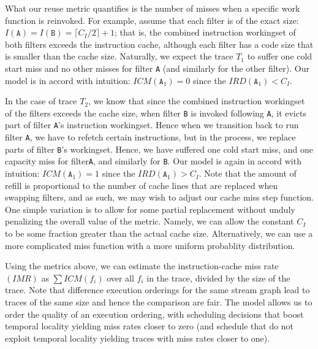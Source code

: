 What our reuse metric quantifies is the number of misses when a specific work
function is reinvoked. For example, assume that each filter is of the exact
size: $I(\texttt{A}) = I(\texttt{B}) = \lceil{C_I / 2}\rceil + 1$;
that is, the combined instruction workingset of both filters exceeds
the instruction cache, although each filter has a code size that is
smaller than the cache size. Naturally, we expect the trace $T_1$ to
suffer one cold start miss and no other misses for filter \texttt{A}
(and similarly for the other filter). Our model is in accord with
intuition:  $ICM(\texttt{A}_1) = 0$ since
the $IRD(\texttt{A}_1) < C_I$.

In the case of trace $T_2$, we know that since the combined
instruction workingset of the filters exceeds the cache size, when
filter \texttt{B} is invoked following \texttt{A}, it evicts part of
filter \texttt{A}'s instruction workingset. Hence when we transition
back to run filter \texttt{A}, we have to refetch certain
instructions, but in the process, we replace parts of filter
\texttt{B}'s workingset. Hence, we have suffered one cold start miss,
and one capacity miss for filter\texttt{A}, and similarly for
\texttt{B}. Our model is again in accord with intuition: 
$ICM(\texttt{A}_1) = 1$ since
the $IRD(\texttt{A}_1) > C_I$. Note that the
amount of refill is proportional to the number of cache lines that are
replaced when swapping filters, and as such, we may wish to adjust
our cache miss step function. One simple variation is to allow for
some partial replacement without unduly penalizing the overall value
of the metric. Namely, we can allow the constant $C_I$ to be some
fraction greater than the actual cache size. Alternatively, we can use
a more complicated miss function with a more uniform probablity
distribution.

Using the metrics above, we can estimate the instruction-cache miss
rate $(IMR)$ as $\sum ICM(f_i)$ over all $f_i$ in the trace, divided
by the size of the trace. Note that difference execution orderings for
the same stream graph lead to traces of the same size and hence the
comparison are fair. The model allows us to order the quality of an
execution ordering, with scheduling decisions that boost temporal
locality yielding miss rates closer to zero (and schedule that do not
exploit temporal locality yielding traces with miss rates closer to
one).


